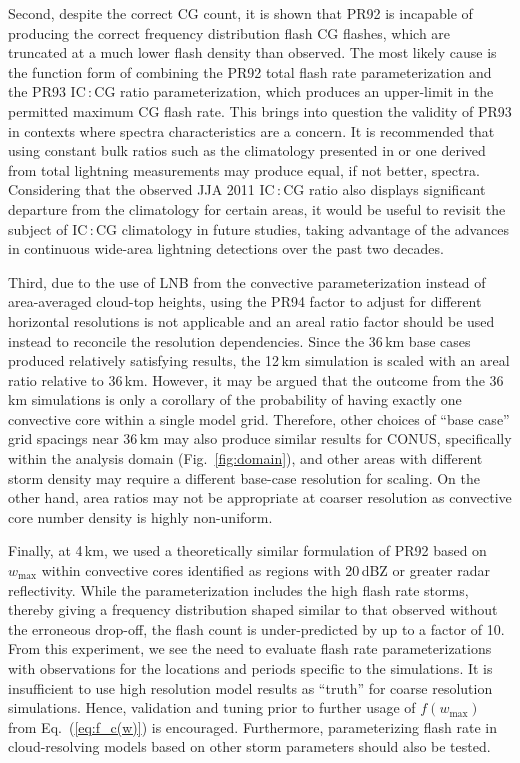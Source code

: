 Second, despite the correct CG count, it is shown that PR92 is incapable of
producing the correct frequency distribution flash CG flashes, which are
truncated at a much lower flash density than observed. The most likely cause
is the function form of combining the PR92 total flash rate parameterization
and the PR93 IC\,:\,CG ratio parameterization, which produces an upper-limit
in the permitted maximum CG flash rate. This brings into question the
validity of PR93 in contexts where spectra characteristics are a concern. It
is recommended that using constant bulk ratios such as the climatology
presented in \citet{Boccippio:2001ys} or one derived from total lightning
measurements may produce equal, if not better, spectra. Considering that the
observed JJA 2011 IC\,:\,CG ratio also displays significant departure from
the \citet{Boccippio:2001ys} climatology for certain areas, it would be
useful to revisit the subject of IC\,:\,CG climatology in future studies,
taking
advantage of the advances in continuous wide-area lightning detections over
the past two decades.

Third, due to the use of LNB from the convective parameterization instead of
area-averaged cloud-top heights, using the PR94 factor to adjust for different
horizontal resolutions is not applicable and an areal ratio factor should be
used instead to reconcile the resolution dependencies. Since the 36\,\unit{km} base
cases produced relatively satisfying results, the 12\,\unit{km} simulation is
scaled with an areal ratio relative to 36\,\unit{km}. However, it may be
argued that the outcome from the 36\,\unit{km} simulations is only a
corollary of the probability of having exactly one convective core within a
single model grid. Therefore, other choices of ``base case'' grid spacings
near 36\,\unit{km} may also produce similar results for CONUS, specifically
within the analysis domain (Fig.~\ref{fig:domain}), and other areas with
different storm density may require a different base-case resolution for
scaling. On the other hand, area ratios may not be appropriate at coarser
resolution as convective core number density is highly non-uniform.

Finally, at 4\,\unit{km}, we used a theoretically similar formulation of PR92
based on $w_{\max}$ within convective cores identified as regions with
20\,\unit{dBZ} or greater radar reflectivity. While the parameterization
includes the high flash rate storms, thereby giving a frequency distribution
shaped similar to that observed without the erroneous drop-off, the flash
count is under-predicted by up to a factor of 10. From this experiment, we
see the need to evaluate flash rate parameterizations with observations for
the locations and periods specific to the simulations. It is insufficient to
use high resolution model results as ``truth'' for coarse resolution
simulations. Hence, validation and tuning prior to further usage of
$f(w_{\max})$ from Eq.~(\ref{eq:f_c(w)}) is encouraged. Furthermore,
parameterizing flash rate in cloud-resolving models based on other storm
parameters \citep{Barthe:2010uq} should also be tested.

